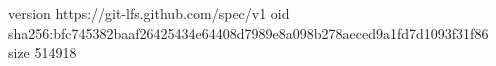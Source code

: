 version https://git-lfs.github.com/spec/v1
oid sha256:bfc745382baaf26425434e64408d7989e8a098b278aeced9a1fd7d1093f31f86
size 514918
